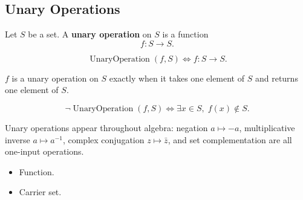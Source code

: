 \subsection{Unary Operations}
\label{subsec:unary-operations}

\begin{tcolorbox}[title={Definition --- Unary Operation}]
\begin{definition}
\label{def:unary-operation}
Let $S$ be a set.
A \textbf{unary operation} on $S$ is a function
\[
f:S \to S.
\]
\end{definition}
\end{tcolorbox}

\begin{remark*}
\[
\operatorname{UnaryOperation}(f,S)
\Longleftrightarrow
f:S\to S.
\]
\end{remark*}

\begin{remark*}
$f$ is a unary operation on $S$ exactly when it takes one element of $S$ and
returns one element of $S$.
\end{remark*}

\begin{remark*}
\[
\neg\operatorname{UnaryOperation}(f,S)
\Longleftrightarrow
\exists x\in S,\; f(x)\notin S.
\]
\end{remark*}

\begin{remark*}[Interpretation]
Unary operations appear throughout algebra: negation $a \mapsto -a$,
multiplicative inverse $a \mapsto a^{-1}$, complex conjugation
$z \mapsto \bar z$, and set complementation are all one-input operations.
\end{remark*}

\begin{remark*}[Dependencies]
\begin{itemize}
  \item Function.
  \item Carrier set.
\end{itemize}
\end{remark*}
